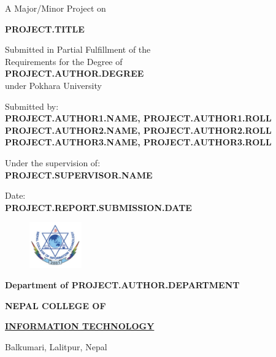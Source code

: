 \documentclass[12pt, a4paper]{report}
\begin{document}
\begin{titlepage}
	\begin{center}
	
	\large%
	A Major/Minor Project on
	
	\huge %
	\textbf{PROJECT.TITLE}

	\vfill
	
	\large %
	Submitted in Partial Fulfillment of the \\ 
	Requirements for the Degree of \\ 
	\textbf {PROJECT.AUTHOR.DEGREE} \\
	under Pokhara University
	
	\vfill
	
	Submitted by: \\ 
	\textbf {PROJECT.AUTHOR1.NAME, PROJECT.AUTHOR1.ROLL} \\
	\textbf {PROJECT.AUTHOR2.NAME, PROJECT.AUTHOR2.ROLL} \\
	\textbf {PROJECT.AUTHOR3.NAME, PROJECT.AUTHOR3.ROLL} \\
	
	\vfill
	
	Under the supervision of: \\
	\textbf {PROJECT.SUPERVISOR.NAME}
	
	\vfill
	
	Date: \\
	\textbf {PROJECT.REPORT.SUBMISSION.DATE}
	
	\vfill
	
	\end{center}
	
	\begin{figure}
	\centering
	\includegraphics[width=0.2\textwidth]{college-logo}
	\end{figure}
	
	\selectfont
	
	\textbf {Department of PROJECT.AUTHOR.DEPARTMENT}  
	
	\Large %
	\textbf {NEPAL COLLEGE OF} 
	
	\LARGE %
	\textbf {\underline {INFORMATION TECHNOLOGY} }
	
	\small %
	Balkumari, Lalitpur, Nepal
	
	
\end{titlepage}
\end{document}

